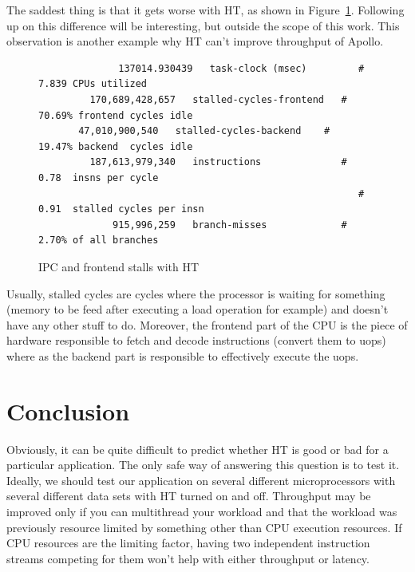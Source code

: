 \documentclass[12pt]{article}
\begin{document}
The saddest thing is that it gets worse with HT, as shown in Figure~\ref{fig:front2}. Following up on this difference will be interesting, but outside the scope of this work. This observation is another example why HT can't improve throughput of Apollo.

\begin{figure}[h]
	\begin{verbatim}
    		  137014.930439   task-clock (msec)         #    7.839 CPUs utilized                                          
   		 170,689,428,657   stalled-cycles-frontend   #   70.69% frontend cycles idle    
  	   47,010,900,540   stalled-cycles-backend    #   19.47% backend  cycles idle    
   		 187,613,979,340   instructions              #    0.78  insns per cycle        
        		                                        #    0.91  stalled cycles per insn                
       		 915,996,259   branch-misses             #    2.70% of all branches         
	\end{verbatim}
	\caption{IPC and frontend stalls with HT}
    \label{fig:front2}
\end{figure}

Usually, stalled cycles are cycles where the processor is waiting for something (memory to be feed after executing a load operation for example) and doesn't have any other stuff to do. Moreover, the frontend part of the CPU is the piece of hardware responsible to fetch and decode instructions (convert them to uops) where as the backend part is responsible to effectively execute the uops.

\section{Conclusion}

Obviously, it can be quite difficult to predict whether HT is good or bad for a particular application. The only safe way of answering this question is to test it. Ideally, we should test our application on several different microprocessors with several different data sets with HT turned on and off. Throughput may be improved only if you can multithread your workload and that the workload was previously resource limited by something other than CPU execution resources. If CPU resources are the limiting factor, having two independent instruction streams competing for them won't help with either throughput or latency.


\end{document}
